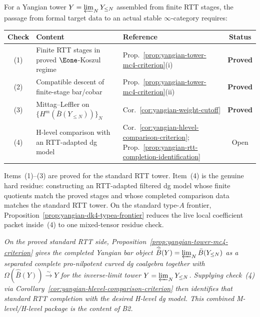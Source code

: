 \begin{remark}
\label{rem:completion-four-checks}
For a Yangian tower $Y = \varprojlim_N Y_{\le N}$ assembled from
finite RTT stages, the passage from formal target data to an
actual stable $\infty$-category requires:
\begin{center}
\renewcommand{\arraystretch}{1.2}
\begin{tabular}{cllc}
\textbf{Check} & \textbf{Content} & \textbf{Reference} & \textbf{Status} \\
\hline
(1) & Finite RTT stages in proved $\Eone$-Koszul regime
 & Prop.~\ref{prop:yangian-tower-mc4-criterion}(i)
 & \textbf{Proved} \\
(2) & Compatible descent of finite-stage bar/cobar
 & Prop.~\ref{prop:yangian-tower-mc4-criterion}(ii)
 & \textbf{Proved} \\
(3) & Mittag--Leffler on $\{H^m(\bar B(Y_{\le N}))\}_N$
 & Cor.~\ref{cor:yangian-weight-cutoff}
 & \textbf{Proved} \\
(4) & H-level comparison with an RTT-adapted dg model
 & Cor.~\ref{cor:yangian-hlevel-comparison-criterion};
 Prop.~\ref{prop:yangian-rtt-completion-identification}
 & Open \\
\end{tabular}
\end{center}
Items~(1)--(3) are proved for the standard RTT tower.
Item~(4) is the genuine hard residue: constructing an RTT-adapted
filtered dg model whose finite quotients match the proved stages and
whose completed comparison data matches the standard RTT tower. On the
standard type-$A$ frontier,
Proposition~\ref{prop:yangian-dk4-typea-frontier} reduces the live
local coefficient packet inside~(4) to one mixed-tensor residue check.

\medskip\noindent
\emph{On the proved standard RTT side,
Proposition~\textup{\ref{prop:yangian-tower-mc4-criterion}} gives the
completed Yangian bar object
$\widehat{\bar B}(Y)=\varprojlim_N \bar B(Y_{\le N})$ as a separated
complete pro-nilpotent curved dg coalgebra together with
$\Omega(\widehat{\bar B}(Y)) \xrightarrow{\sim} Y$ for the inverse-limit
tower $Y=\varprojlim_N Y_{\le N}$. Supplying check~\textup{(4)} via
Corollary~\textup{\ref{cor:yangian-hlevel-comparison-criterion}} then
identifies that standard RTT completion with the desired H-level dg
model. This combined M-level/H-level package is the content of B2.}
\end{remark}

